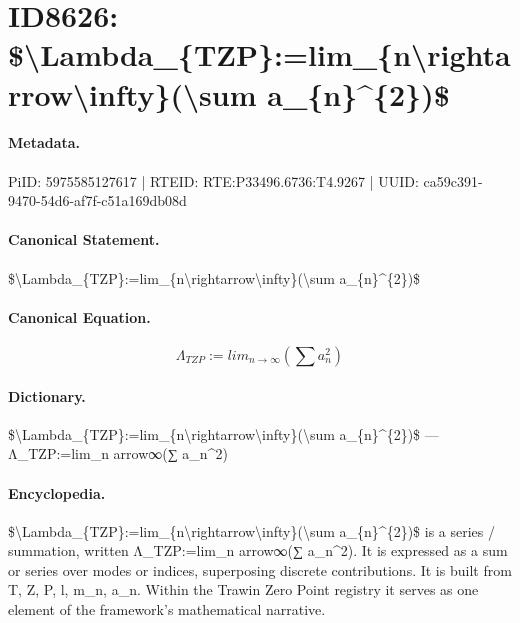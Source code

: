 \section*{ID8626: \$\textbackslash{}Lambda\_\{TZP\}:=lim\_\{n\textbackslash{}rightarrow\textbackslash{}infty\}(\textbackslash{}sum a\_\{n\}\textasciicircum{}\{2\})\$}
\paragraph{Metadata.}
PiID: 5975585127617 | RTEID: RTE:P33496.6736:T4.9267 | UUID: ca59c391-9470-54d6-af7f-c51a169db08d

\paragraph{Canonical Statement.}
\$\textbackslash{}Lambda\_\{TZP\}:=lim\_\{n\textbackslash{}rightarrow\textbackslash{}infty\}(\textbackslash{}sum a\_\{n\}\textasciicircum{}\{2\})\$

\paragraph{Canonical Equation.}
\[
\Lambda_{TZP}:=lim_{n\rightarrow\infty}(\sum a_{n}^{2})
\]

\paragraph{Dictionary.}
\$\textbackslash{}Lambda\_\{TZP\}:=lim\_\{n\textbackslash{}rightarrow\textbackslash{}infty\}(\textbackslash{}sum a\_\{n\}\textasciicircum{}\{2\})\$ — Λ\_TZP:=lim\_n arrow∞(∑ a\_n\textasciicircum{}2)

\paragraph{Encyclopedia.}
\$\textbackslash{}Lambda\_\{TZP\}:=lim\_\{n\textbackslash{}rightarrow\textbackslash{}infty\}(\textbackslash{}sum a\_\{n\}\textasciicircum{}\{2\})\$ is a series / summation, written Λ\_TZP:=lim\_n arrow∞(∑ a\_n\textasciicircum{}2). It is expressed as a sum or series over modes or indices, superposing discrete contributions. It is built from T, Z, P, l, m\_n, a\_n. Within the Trawin Zero Point registry it serves as one element of the framework's mathematical narrative.
